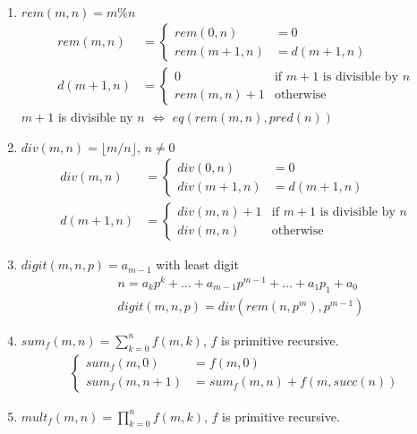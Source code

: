 \begin{enumerate}
    \item $rem(m,n)=m\%n$
    {\scriptsize
    \begin{align*}
        rem(m,n)&=\left\{ \begin{array}{rl}
            rem(0,n)&=0\\
            rem(m+1,n)&= d(m+1,n)
        \end{array} \right.\\
        d(m+1,n)&=\left\{ \begin{array}{ll}
            0 & \text{if $m+1$ is divisible by $n$}\\
            rem(m,n)+1 & \text{otherwise}
        \end{array} \right.
    \end{align*}
    }
    $m+1$ is divisible ny $n$ $\iff$ $eq(rem(m,n), pred(n))$
    \item $div(m,n)=\lfloor m/n \rfloor$, $n\ne 0$
    {\scriptsize
    \begin{align*}
        div(m,n)&=\left\{ \begin{array}{rl}
            div(0,n)&=0\\
            div(m+1,n)&= d(m+1,n)
        \end{array} \right.\\
        d(m+1,n)&=\left\{ \begin{array}{ll}
            div(m,n)+1 & \text{if $m+1$ is divisible by $n$}\\
            div(m,n) & \text{otherwise}
        \end{array} \right.
    \end{align*}
    }
    \item $digit(m,n,p)=a_{m-1}$ with least digit
    \begin{align*}
        &n=a_k p^k+\dots+a_{m-1}p^{m-1}+\dots+a_1p_1+a_0\\
        &digit(m,n,p)=div(rem(n,p^m),p^{m-1})
    \end{align*}
    \item $\displaystyle sum_f(m,n)=\sum_{k=0}^n f(m,k)$, $f$ is primitive recursive. 
    \begin{align*}
        \left\{ \begin{array}{rl}
            sum_f(m,0)&=f(m,0)\\
            sum_f(m,n+1)&=sum_f(m,n)+f(m,succ(n))
        \end{array} \right.
    \end{align*}
    \item $\displaystyle mult_f(m,n)=\prod_{k=0}^n f(m,k)$, $f$ is primitive recursive. 

\end{enumerate}
